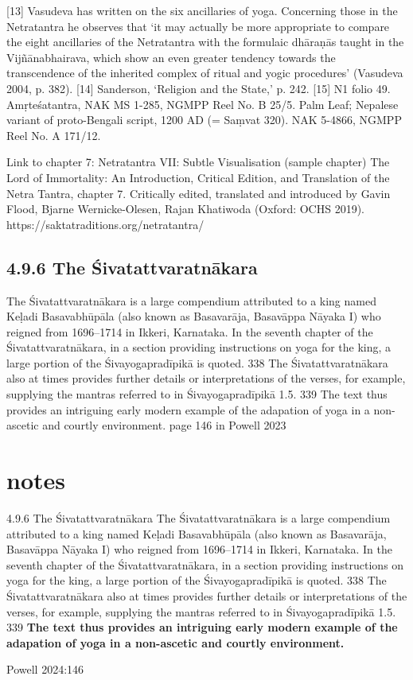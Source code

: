 [13] Vasudeva has written on the six ancillaries of yoga. Concerning those in the Netratantra he observes that ‘it may actually be more appropriate to compare the eight ancillaries of the Netratantra with the formulaic dhāraṇās taught in the Vijñānabhairava, which show an even greater tendency towards the transcendence of the inherited complex of ritual and yogic procedures’ (Vasudeva 2004, p. 382).
[14] Sanderson, ‘Religion and the State,’ p. 242.
[15] N1 folio 49. Amṛteśatantra, NAK MS 1-285, NGMPP Reel No. B 25/5. Palm Leaf; Nepalese variant of proto-Bengali script, 1200 AD (= Saṃvat 320). NAK 5-4866, NGMPP Reel No. A 171/12.

Link to chapter 7: Netratantra VII: Subtle Visualisation (sample chapter)
The Lord of Immortality: An Introduction, Critical Edition, and Translation of the Netra Tantra, chapter 7. Critically edited, translated and introduced by Gavin Flood, Bjarne Wernicke-Olesen, Rajan Khatiwoda (Oxford: OCHS 2019).
https://saktatraditions.org/netratantra/

\section{4.9.6 The Śivatattvaratnākara}
The Śivatattvaratnākara is a large compendium attributed to a king named Keḷadi Basavabhūpāla (also
known as Basavarāja, Basavāppa Nāyaka I) who reigned from 1696–1714 in Ikkeri, Karnataka. In the
seventh chapter of the Śivatattvaratnākara, in a section providing instructions on yoga for the king, a
large portion of the Śivayogapradīpikā is quoted. 338 The Śivatattvaratnākara also at times provides
further details or interpretations of the verses, for example, supplying the mantras referred to in
Śivayogapradīpikā 1.5. 339 The text thus provides an intriguing early modern example of the adapation of
yoga in a non-ascetic and courtly environment. page 146 in Powell 2023

\chapter{notes}
4.9.6 The Śivatattvaratnākara
The Śivatattvaratnākara is a large compendium attributed to a king named Keḷadi Basavabhūpāla (also
known as Basavarāja, Basavāppa Nāyaka I) who reigned from 1696–1714 in Ikkeri, Karnataka. In the
seventh chapter of the Śivatattvaratnākara, in a section providing instructions on yoga for the king, a
large portion of the Śivayogapradīpikā is quoted. 338 The Śivatattvaratnākara also at times provides
further details or interpretations of the verses, for example, supplying the mantras referred to in
Śivayogapradīpikā 1.5. 339 \textbf{The text thus provides an intriguing early modern example of the adapation of
yoga in a non-ascetic and courtly environment.}

Powell 2024:146

